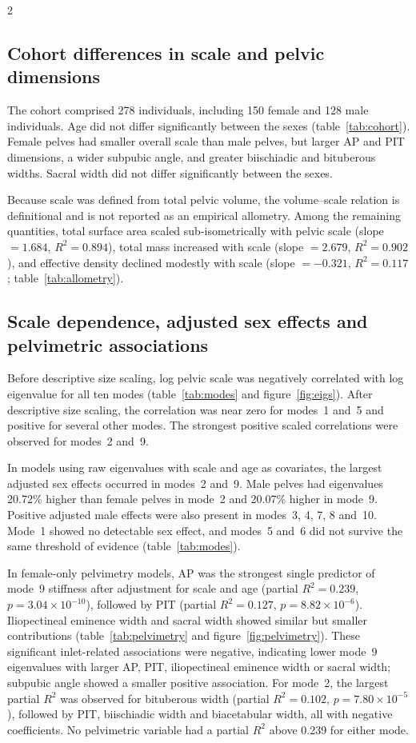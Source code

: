 \documentclass[openacc]{rsproca_new}
\begin{document}
\begin{multicols}{2}
\subsection{Cohort differences in scale and pelvic dimensions}

The cohort comprised 278 individuals, including 150 female and 128 male individuals. Age did not differ significantly between the sexes (table~\ref{tab:cohort}). Female pelves had smaller overall scale than male pelves, but larger AP and PIT dimensions, a wider subpubic angle, and greater biischiadic and bituberous widths. Sacral width did not differ significantly between the sexes.

Because scale was defined from total pelvic volume, the volume--scale relation is definitional and is not reported as an empirical allometry. Among the remaining quantities, total surface area scaled sub-isometrically with pelvic scale (slope $=1.684$, $R^2=0.894$), total mass increased with scale (slope $=2.679$, $R^2=0.902$), and effective density declined modestly with scale (slope $=-0.321$, $R^2=0.117$; table~\ref{tab:allometry}).

\subsection{Scale dependence, adjusted sex effects and pelvimetric associations}

Before descriptive size scaling, log pelvic scale was negatively correlated with log eigenvalue for all ten modes (table~\ref{tab:modes} and figure~\ref{fig:eigs}). After descriptive size scaling, the correlation was near zero for modes~1 and~5 and positive for several other modes. The strongest positive scaled correlations were observed for modes~2 and~9.

In models using raw eigenvalues with scale and age as covariates, the largest adjusted sex effects occurred in modes~2 and~9. Male pelves had eigenvalues 20.72\% higher than female pelves in mode~2 and 20.07\% higher in mode~9. Positive adjusted male effects were also present in modes~3, 4, 7, 8 and~10. Mode~1 showed no detectable sex effect, and modes~5 and~6 did not survive the same threshold of evidence (table~\ref{tab:modes}).

In female-only pelvimetry models, AP was the strongest single predictor of mode~9 stiffness after adjustment for scale and age (partial $R^2=0.239$, $p=3.04 \times 10^{-10}$), followed by PIT (partial $R^2=0.127$, $p=8.82 \times 10^{-6}$). Iliopectineal eminence width and sacral width showed similar but smaller contributions (table~\ref{tab:pelvimetry} and figure~\ref{fig:pelvimetry}). These significant inlet-related associations were negative, indicating lower mode~9 eigenvalues with larger AP, PIT, iliopectineal eminence width or sacral width; subpubic angle showed a smaller positive association. For mode~2, the largest partial $R^2$ was observed for bituberous width (partial $R^2=0.102$, $p=7.80 \times 10^{-5}$), followed by PIT, biischiadic width and biacetabular width, all with negative coefficients. No pelvimetric variable had a partial $R^2$ above 0.239 for either mode.


\end{multicols}
\end{document}
